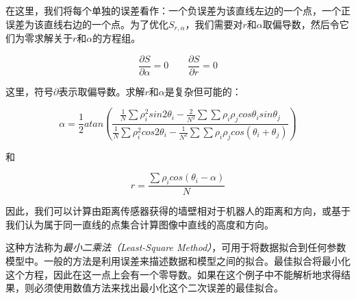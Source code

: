 在这里，我们将每个单独的误差看作：一个负误差为该直线左边的一个点，一个正误差为该直线右边的一个点。为了优化$S_{r,\alpha}$，我们需要对$r$和$\alpha$取偏导数，然后令它们为零求解关于$r$和$\alpha$的方程组。

\begin{equation}
\frac{\partial{S}}{\partial{\alpha}}=0 \qquad \frac{\partial{S}}{\partial{r}}=0
\end{equation}


这里，符号$\partial$表示取偏导数。求解$r$和$\alpha$是复杂但可能的\cite{siegwart2011introduction}：

\begin{equation}\label{eq:linealpha}
\alpha=\frac{1}{2}atan\left(\frac{\frac{1}{N}\sum{\rho_i^2 sin 2\theta_i}-\frac{2}{N^2}\sum{\sum{\rho_i\rho_j cos \theta_i sin \theta_j}}}{\frac{1}{N}\sum{\rho_i^2 cos 2 \theta_i - \frac{1}{N^2}\sum{\sum{\rho_i \rho_j cos(\theta_i+\theta_j)}}}}\right)
\end{equation}

和

\begin{equation}\label{eq:liner}
r=\frac{{\sum \rho_i cos (\theta_i-\alpha)}}{N}
\end{equation}


因此，我们可以计算由距离传感器获得的墙壁相对于机器人的距离和方向，或基于我们认为属于同一直线的点集合计算图像中直线的高度和方向。


这种方法称为\emph{最小二乘法（Least-Square Method）}，可用于将数据拟合到任何参数模型中。一般的方法是利用误差来描述数据和模型之间的拟合。最佳拟合将最小化这个方程，因此在这一点上会有一个零导数。如果在这个例子中不能解析地求得结果，则必须使用数值方法来找出最小化这个二次误差的最佳拟合。


